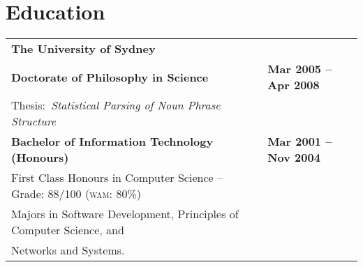 \documentclass[]{article}
\begin{document}
\vspace{-0.7cm}
\section*{Education}

\setlength{\tabcolsep}{0.1cm}
\begin{table*}[h!]
\begin{tabular}[h!]{p{12.7cm}l}

\textbf{The University of Sydney} & \\
\textbf{Doctorate of Philosophy in Science} & \textbf{Mar 2005 -- Apr 2008}\\
\hspace{0.5cm}Thesis:~\textit{Statistical Parsing of Noun Phrase Structure} & \\

\textbf{Bachelor of Information Technology (Honours)} & \textbf{Mar 2001 -- Nov 2004}\\
\hspace{0.5cm}First Class Honours in Computer Science -- Grade: 88/100 (\textsc{wam}: 80\%) & \\
\hspace{0.5cm}Majors in Software Development, Principles of Computer Science, and & \\
\hspace{0.5cm}Networks and Systems. & \\


\end{tabular}
\end{table*}
\end{document}
